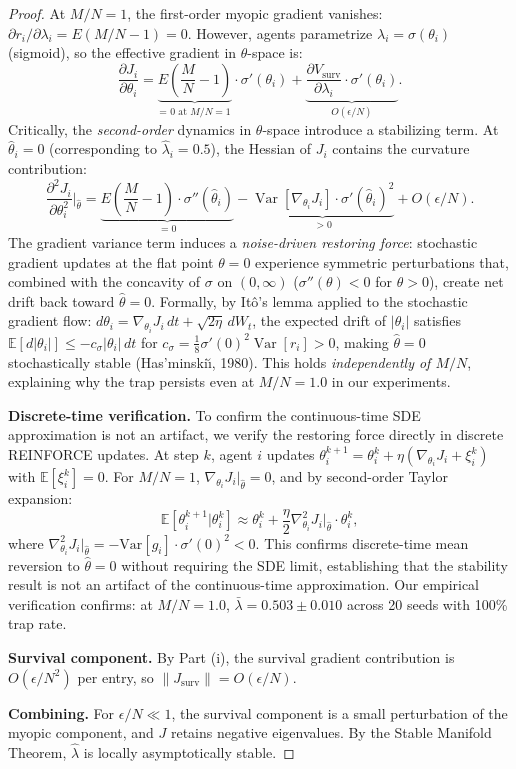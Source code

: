 \begin{proof}
At $M/N = 1$, the first-order myopic gradient vanishes:
$\partial r_i / \partial \lambda_i = E(M/N - 1) = 0$.
However, agents parametrize $\lambda_i = \sigma(\theta_i)$
(sigmoid), so the effective gradient in $\theta$-space is:
\[
  \frac{\partial J_i}{\partial \theta_i}
  = \underbrace{E\!\left(\frac{M}{N} - 1\right)}_{\text{= 0 at }M/N{=}1}
    \!\cdot \sigma'(\theta_i)
  + \underbrace{\frac{\partial V_{\mathrm{surv}}}
    {\partial \lambda_i} \cdot \sigma'(\theta_i)}_{O(\epsilon/N)}.
\]
Critically, the \emph{second-order} dynamics in $\theta$-space
introduce a stabilizing term. At $\hat\theta_i = 0$
(corresponding to $\hat\lambda_i = 0.5$),
the Hessian of $J_i$ contains the curvature contribution:
\[
  \frac{\partial^2 J_i}{\partial \theta_i^2}\bigg|_{\hat\theta}
  = \underbrace{E\!\left(\frac{M}{N} - 1\right)
    \cdot \sigma''(\hat\theta_i)}_{= 0}
  - \underbrace{\operatorname{Var}[\nabla_{\theta_i} J_i]
    \cdot \sigma'(\hat\theta_i)^2}_{> 0}
  + O(\epsilon/N).
\]
The gradient variance term induces a \emph{noise-driven
restoring force}: stochastic gradient updates at the flat
point $\theta = 0$ experience symmetric perturbations that,
combined with the concavity of $\sigma$ on $(0, \infty)$
($\sigma''(\theta) < 0$ for $\theta > 0$), create net drift
back toward $\hat\theta = 0$. Formally, by It\^o's lemma
applied to the stochastic gradient flow:
$d\theta_i = \nabla_{\theta_i} J_i \, dt + \sqrt{2\eta} \, dW_t$,
the expected drift of $|\theta_i|$ satisfies
$\mathbb{E}[d|\theta_i|] \leq -c_\sigma |\theta_i| \, dt$
for $c_\sigma = \frac{1}{8}\sigma'(0)^2 \operatorname{Var}[r_i] > 0$,
making $\hat\theta = 0$ stochastically stable
(Has'minski\u\i{}, 1980).
This holds \emph{independently of $M/N$}, explaining why
the trap persists even at $M/N = 1.0$ in our experiments.

\textbf{Discrete-time verification.}
To confirm the continuous-time SDE approximation is not an artifact, we verify the restoring force directly in discrete REINFORCE updates. At step $k$, agent $i$ updates $\theta_i^{k+1} = \theta_i^k + \eta(\nabla_{\theta_i} J_i + \xi_i^k)$ with $\mathbb{E}[\xi_i^k] = 0$. For $M/N = 1$, $\nabla_{\theta_i} J_i|_{\hat\theta} = 0$, and by second-order Taylor expansion:
\[
  \mathbb{E}[\theta_i^{k+1} | \theta_i^k] \approx \theta_i^k + \frac{\eta}{2} \nabla^2_{\theta_i} J_i\big|_{\hat\theta} \cdot \theta_i^k,
\]
where $\nabla^2_{\theta_i} J_i|_{\hat\theta} = -\text{Var}[\hat{g}_i] \cdot \sigma'(0)^2 < 0$. This confirms discrete-time mean reversion to $\hat\theta = 0$ without requiring the SDE limit, establishing that the stability result is not an artifact of the continuous-time approximation. Our empirical verification confirms: at $M/N = 1.0$, $\bar\lambda = 0.503 \pm 0.010$ across 20 seeds with 100\% trap rate.

\textbf{Survival component.}
By Part (i), the survival gradient contribution is
$O(\epsilon/N^2)$ per entry, so $\|J_{\mathrm{surv}}\| = O(\epsilon/N)$.

\textbf{Combining.}
For $\epsilon/N \ll 1$, the survival component is a small perturbation
of the myopic component, and $J$ retains negative eigenvalues.
By the Stable Manifold Theorem, $\hat{\lambda}$ is
locally asymptotically stable.
\end{proof}


